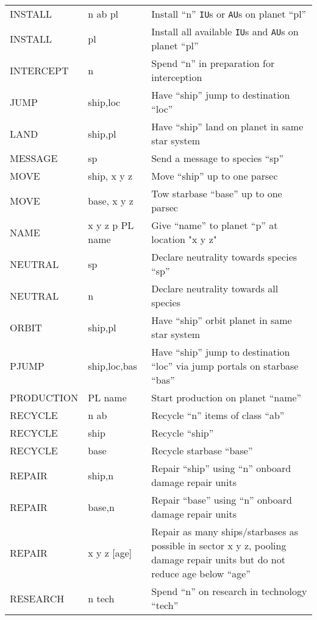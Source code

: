 \documentclass[10pt,titlepage]{article}
\begin{document}
\begin{longtable}{llp{9cm}}
INSTALL   &      n ab pl      &   Install ``n'' \texttt{IU}s or \texttt{AU}s on planet ``pl'' \\
INSTALL   &      pl           &   Install all available \texttt{IU}s and \texttt{AU}s on planet ``pl'' \\
INTERCEPT &      n            &   Spend ``n'' in preparation for interception \\
JUMP     &       ship,loc     &   Have ``ship'' jump to destination ``loc'' \\
LAND     &       ship,pl      &   Have ``ship'' land on planet in same star system \\
MESSAGE  &       sp           &   Send a message to species ``sp'' \\
MOVE     &       ship, x y z  &   Move ``ship'' up to one parsec \\
MOVE     &       base, x y z  &   Tow starbase ``base'' up to one parsec \\
NAME     &       x y z p PL name &  Give ``name'' to planet ``p'' at location "x y z" \\
NEUTRAL  &       sp           &   Declare neutrality towards species ``sp'' \\
NEUTRAL  &       n            &   Declare neutrality towards all species \\
ORBIT    &       ship,pl      &   Have ``ship'' orbit planet in same star system \\
PJUMP    &       ship,loc,bas &   Have ``ship'' jump to destination ``loc'' via jump portals on starbase ``bas'' \\
PRODUCTION &     PL name   &      Start production on planet ``name'' \\
RECYCLE    &     n ab      &      Recycle ``n'' items of class ``ab'' \\
RECYCLE    &     ship      &      Recycle ``ship'' \\
RECYCLE    &     base      &      Recycle starbase ``base'' \\
REPAIR     &     ship,n    &      Repair ``ship'' using ``n'' onboard damage repair units \\
REPAIR    &      base,n     &     Repair ``base'' using ``n'' onboard damage repair units \\
REPAIR    &      x y z [age]&     Repair as many ships/starbases as possible in sector x y z, pooling damage repair units but do not reduce age below ``age'' \\
RESEARCH  &      n tech    &      Spend ``n'' on research in technology ``tech'' \\

\end{longtable}
\end{document}
